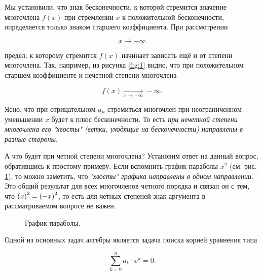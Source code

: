 \documentclass[12pt]{article}
\begin{document}
\par 
Мы установили, что знак бесконечности, к которой стремится значение многочлена $f(x)$ при стремлении $x$ к положительной бесконечности, определяется только знаком старшего коэффициента. При рассмотрении 

\begin{equation}
x\rightarrow-\infty
\end{equation}

предел, к которому стремится $f(x)$ начинает зависеть ещё и от степени многочлена. Так, например, из рисунка \ref{fig:1} видно, что при положительном старшем коэффициенте и нечетной степени многочлена 

\begin{equation}
	f(x) \underset{x\rightarrow-\infty}{\longrightarrow}-\infty.
\end{equation}

Ясно, что при отрицательном $a_n$ стремиться многочлен при неограниченном уменьшении $x$ будет к плюс бесконечности. То есть \emph{при нечетной степени многочлена его "хвосты" (ветки, уходящие на бесконечности) направлены в разные стороны}. 

\par 
А что будет при четной степени многочлена? Установим ответ на данный вопрос, обратившись к простому примеру. Если вспомнить график параболы $x^2$ (см. рис. \ref{fig:2}), то можно заметить, что \emph{"хвосты" графика направлены в одном направлении}. Это общий результат для всех многочленов четного порядка и связан он с тем, что $\qty(x)^2 = \qty(-x)^2$, то есть для четных степеней знак аргумента в рассматриваемом вопросе не важен. 

\begin{figure}[htbp]
\centering
{}
\caption{График параболы.}
\label{fig:2}
\end{figure}

\par
Одной из основных задач алгебры является задача поиска корней уравнения типа

\begin{equation}\label{eq:1}
\sum_{k=0}^n{a_k \cdot x^k} = 0.
\end{equation}
\end{document}
